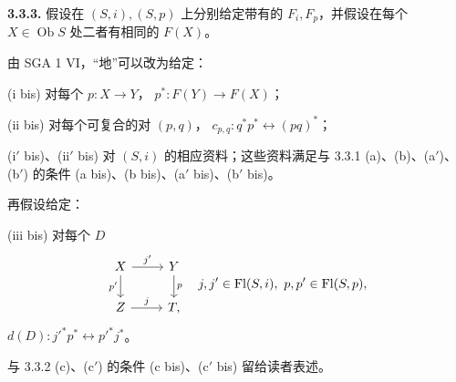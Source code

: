 \textbf{3.3.3.} 假设在 $(S,i),(S,p)$ 上分别给定带有的 $F_i,F_p$，并假设在每个 $X\in\operatorname{Ob}S$ 处二者有相同的 $F(X)$。

由 SGA 1 VI，“地”可以改为给定：

(i bis) 对每个 $p:X\to Y$， $p^*:F(Y)\to F(X)$；

(ii bis) 对每个可复合的对 $(p,q)$， $c_{p,q}:q^*p^*\leftrightarrow(pq)^*$；

(i$'$ bis)、(ii$'$ bis) 对 $(S,i)$ 的相应资料；这些资料满足与 3.3.1 (a)、(b)、(a$'$)、(b$'$) 的条件 (a bis)、(b bis)、(a$'$ bis)、(b$'$ bis)。

再假设给定：

(iii bis) 对每个 $D$
\[\begin{tikzcd}X\arrow[r,"j'"]\arrow[d,"p'"']&Y\arrow[d,"p"]\\Z\arrow[r,"j"]&T,\end{tikzcd}\quad j,j'\in\operatorname{Fl}(S,i),\ p,p'\in\operatorname{Fl}(S,p),\]
 $d(D):j'^*p^*\leftrightarrow p'^*j^*$。

与 3.3.2 (c)、(c$'$) 的条件 (c bis)、(c$'$ bis) 留给读者表述。

